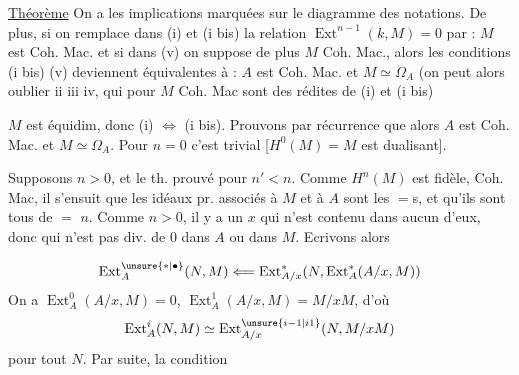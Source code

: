 \uline{Théorème} On a les implications marquées sur le diagramme des notations. De plus, si on remplace dans (i) et (i bis) la relation $\operatorname{Ext}^{n-1}(k,M)=0$ par : $M$ est Coh. Mac. et si dans (v) on suppose de plus $M$ Coh. Mac., alors  les conditions  (i bis) (v) deviennent équivalentes à : $A$ est Coh. Mac. et $M\simeq\Omega_A$ (on peut alors oublier ii iii iv, qui pour $M$ Coh. Mac sont des rédites de (i) et (i bis)

$M$ est équidim, donc (i) $\Leftrightarrow$ (i bis). Prouvons par récurrence que alors $A$ est Coh. Mac. et $M\simeq\Omega_A$. Pour $n=0$ c'est trivial [$H^0(M)=M$ est dualisant].

Supposons $n>0$, et le th. prouvé pour $n'<n$.  Comme $H^n(M)$ est fidèle,   Coh. Mac, il s'ensuit que les idéaux pr. associés à $M$ et à $A$ sont les $=$s, et qu'ils sont tous de $=$   $n$. Comme $n>0$, il y a un $x$ qui n'est contenu dans aucun d'eux, donc qui n'est pas div. de $0$ dans $A$ ou dans $M$.  Ecrivons alors

\[
 \operatorname{Ext}_{A}^{\unsure{*|\bullet}}(N,M)\Longleftarrow
 \operatorname{Ext}_{A/x}^{*}(N,\operatorname{Ext}_{A}^{*}(A/x,M))
\]
On a $\operatorname{Ext}_{A}^{0}(A/x,M)=0$, $\operatorname{Ext}_{A}^{1}(A/x,M)=M/xM$, d'où
\[
 \operatorname{Ext}_{A}^{i}(N,M)\simeq\operatorname{Ext}_{A/x}^{\unsure{i-1|i1}}(N,M/xM)
\]
pour tout $N$. Par suite, la condition 

